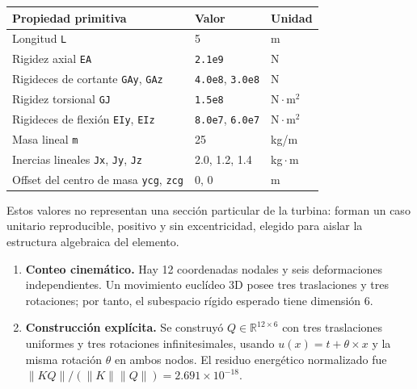\documentclass[oneside,a4paper,spanish,links]{amca}
\begin{document}
\begingroup
\small
\renewcommand{\arraystretch}{1.16}
\begin{center}
\begin{tabularx}{\textwidth}{@{}YYY@{}}
\toprule
\textbf{Propiedad primitiva} & \textbf{Valor} & \textbf{Unidad} \\
\midrule
Longitud \texttt{L}\allowbreak{} & 5 & m \\
Rigidez axial \texttt{EA}\allowbreak{} & \texttt{2.1e9}\allowbreak{} & N \\
Rigideces de cortante \texttt{GAy}\allowbreak{}, \texttt{GAz}\allowbreak{} & \texttt{4.0e8}\allowbreak{}, \texttt{3.0e8}\allowbreak{} & N \\
Rigidez torsional \texttt{GJ}\allowbreak{} & \texttt{1.5e8}\allowbreak{} & N\,$\cdot$\,m$^2$ \\
Rigideces de flexión \texttt{EIy}\allowbreak{}, \texttt{EIz}\allowbreak{} & \texttt{8.0e7}\allowbreak{}, \texttt{6.0e7}\allowbreak{} & N\,$\cdot$\,m$^2$ \\
Masa lineal \texttt{m}\allowbreak{} & 25 & kg/m \\
Inercias lineales \texttt{Jx}\allowbreak{}, \texttt{Jy}\allowbreak{}, \texttt{Jz}\allowbreak{} & 2.0, 1.2, 1.4 & kg\,$\cdot$\,m \\
Offset del centro de masa \texttt{ycg}\allowbreak{}, \texttt{zcg}\allowbreak{} & 0, 0 & m \\
\bottomrule
\end{tabularx}
\end{center}
\endgroup

Estos valores no representan una sección particular de la turbina: forman un caso unitario reproducible, positivo y sin excentricidad, elegido para aislar la estructura algebraica del elemento.

\begin{enumerate}
\item \textbf{Conteo cinemático.} Hay 12 coordenadas nodales y seis deformaciones independientes. Un movimiento euclídeo 3D posee tres traslaciones y tres rotaciones; por tanto, el subespacio rígido esperado tiene dimensión 6.
\item \textbf{Construcción explícita.} Se construyó $Q\in\mathbb{R}^{12\times6}$ con tres traslaciones uniformes y tres rotaciones infinitesimales, usando $u(x)=t+\theta\times x$ y la misma rotación $\theta$ en ambos nodos. El residuo energético normalizado fue $\lVert KQ\rVert/(\lVert K\rVert\lVert Q\rVert)=2.691\times10^{-18}$.
\end{enumerate}
\end{document}
